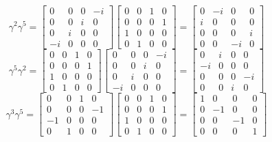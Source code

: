 $$
\gamma^{2} \gamma^{5}=\begin{bmatrix}
0 & 0 & 0 & -i \\
0 & 0 & i & 0 \\
0 & i & 0 & 0 \\
-i & 0 & 0 & 0
\end{bmatrix}\begin{bmatrix}
0 & 0 & 1 & 0 \\
0 & 0 & 0 & 1 \\
1 & 0 & 0 & 0 \\
0 & 1 & 0 & 0
\end{bmatrix}=\begin{bmatrix}
0 & -i & 0 & 0 \\
i & 0 & 0 & 0 \\
0 & 0 & 0 & i \\
0 & 0 & -i & 0
\end{bmatrix}
$$
$$
\gamma^{5} \gamma^{2}=\begin{bmatrix}
0 & 0 & 1 & 0 \\
0 & 0 & 0 & 1 \\
1 & 0 & 0 & 0 \\
0 & 1 & 0 & 0
\end{bmatrix}\begin{bmatrix}
0 & 0 & 0 & -i \\
0 & 0 & i & 0 \\
0 & i & 0 & 0 \\
-i & 0 & 0 & 0
\end{bmatrix}=\begin{bmatrix}
0 & i & 0 & 0 \\
-i & 0 & 0 & 0 \\
0 & 0 & 0 & -i \\
0 & 0 & i & 0
\end{bmatrix}
$$
$$
\gamma^{3} \gamma^{5}=\begin{bmatrix}
0 & 0 & 1 & 0 \\
0 & 0 & 0 & -1 \\
-1 & 0 & 0 & 0 \\
0 & 1 & 0 & 0
\end{bmatrix}\begin{bmatrix}
0 & 0 & 1 & 0 \\
0 & 0 & 0 & 1 \\
1 & 0 & 0 & 0 \\
0 & 1 & 0 & 0
\end{bmatrix}=\begin{bmatrix}
1 & 0 & 0 & 0 \\
0 & -1 & 0 & 0 \\
0 & 0 & -1 & 0 \\
0 & 0 & 0 & 1
\end{bmatrix}
$$

